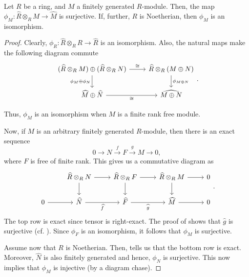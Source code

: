 \begin{prop} \label{prop:finitely-generated-tensor-completion-isomorphism}
	Let $R$ be a ring, and $M$ a finitely generated $R$-module. Then, the map $\phi_{M} : \widehat{R} \otimes_{R} M \to \widehat{M}$ is surjective. If, further, $R$ is Noetherian, then $\phi_{M}$ is an isomorphism.
\end{prop}
\begin{proof} 
	Clearly, $\phi_{R} : \widehat{R} \otimes_{R} R \to \widehat{R}$ is an isomorphism. Also, the natural maps make the following diagram commute
	\begin{equation*} 
		\begin{tikzcd}
			(\widehat{R} \otimes_{R} M) \oplus (\widehat{R} \otimes_{R} N) \arrow[r, "\cong"] \arrow[d, "\phi_{M} \oplus \phi_{N}"'] & \widehat{R} \otimes_{R} (M \oplus N) \arrow[d, "\phi_{M \oplus N}"] \\
			\widehat{M} \oplus \widehat{N} \arrow[r, "\cong"'] & \widehat{M \oplus N}
		\end{tikzcd}.
	\end{equation*}

	Thus, $\phi_{M}$ is an isomorphism when $M$ is a finite rank free module.

	Now, if $M$ is an arbitrary finitely generated $R$-module, then there is an exact sequence
	\begin{equation*} 
		0 \to N \xrightarrow{f} F \xrightarrow{g} M \to 0,
	\end{equation*}
	where $F$ is free of finite rank. This gives us a commutative diagram as
	\begin{equation*} 
		\begin{tikzcd}
			& \widehat{R} \otimes_{R} N \arrow[r] \arrow[d] & \widehat{R} \otimes_{R} F \arrow[r] \arrow[d] & \widehat{R} \otimes_{R} M \arrow[r] \arrow[d] & 0 \\
			0 \arrow[r] & \widehat{N} \arrow[r, "\widehat{f}"'] & \widehat{F} \arrow[r, "\widehat{g}"'] & \widehat{M} \arrow[r] & 0
		\end{tikzcd}.
	\end{equation*}
	The top row is exact since tensor is right-exact. The proof of  shows that $\widehat{g}$ is surjective (cf. ). Since $\phi_{F}$ is an isomorphism, it follows that $\phi_{M}$ is surjective.

	Assume now that $R$ is Noetherian. Then,  tells us that the bottom row is exact. Moreover, $\widehat{N}$ is also finitely generated and hence, $\phi_{N}$ is surjective. This now implies that $\phi_{M}$ is injective (by a diagram chase).
\end{proof}

